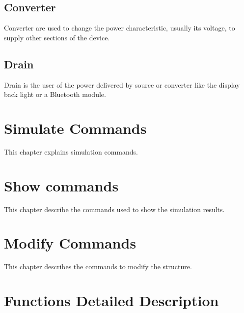 \documentclass[12pt,a4paper]{book}
\begin{document}
\section{Converter}
Converter are used to change the power characteristic, usually its voltage, to supply other sections of the device.
\section{Drain}
Drain is the user of the power delivered by source or converter like the display back light or a Bluetooth module.
\chapter{Simulate Commands}
This chapter explains simulation commands.
\chapter{Show commands}
This chapter describe the commands used to show the simulation results.
\chapter{Modify Commands}
This chapter describes the commands to modify the structure.

\chapter{Functions Detailed Description}

\end{document}
